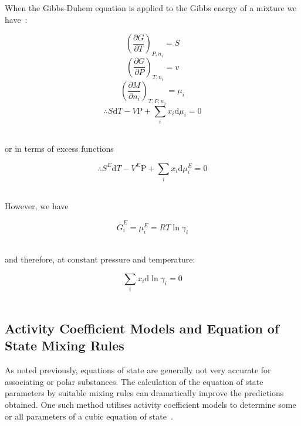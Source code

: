 When the Gibbs-Duhem equation is applied to the Gibbs energy of a mixture we have~\cite{MolecularThermodynamicsOfFluidPhaseEquilibria}:\

\begin{equation}
 \left( \frac{\partial G}{\partial T}\right)_{P, n_{i}} = S \label{GibbsTempDerivative}
\end{equation}
\begin{equation}
 \left( \frac{\partial G}{\partial P}\right)_{T, n_{i}} = v\label{GibbsPressureDerivative}
 \end{equation}
 \begin{equation}
 \left( \frac{\partial M}{\partial n_{i}}\right)_{T, P, n_{j}} = \mu_{i}
\end{equation}
\begin{equation}
\therefore S\mathrm{d}T - V \mathrm{P} + \sum_{i} x_{i} \mathrm{d}\mu_{i} = 0 \label{GibbsEnergyGibbsDuhem}
\end{equation}\

or in terms of excess functions\

\begin{equation}
\therefore S^{E}\mathrm{d}T - V^{E} \mathrm{P} + \sum_{i} x_{i} \mathrm{d}\mu_{i}^{E} = 0 \label{GibbsEnergyGibbsDuhem}
\end{equation}\

However, we have\

\begin{equation}
\bar{G}^{E}_{i} = \mu_{i}^{E} = RT \ln \gamma_{i}
\end{equation}\

and therefore, at constant pressure and temperature:\

\begin{equation}
\sum_{i} x_{i} \mathrm{d} \ln \gamma_{i} = 0
\end{equation}\


\subsection{Activity Coefficient Models and Equation of State Mixing Rules}

As noted previously, equations of state are generally not very accurate for associating or polar substances. The calculation of the equation of state parameters by suitable mixing rules can dramatically improve the predictions obtained. One such method utilises activity coefficient models to determine some or all parameters of a cubic equation of state~\cite{ThermophysicalProperties}.\\

